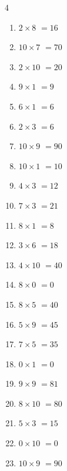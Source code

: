 \begin{multicols}{4}
\begin{enumerate}
  \item $2\times 8$
        $=16$

  \item $10\times 7$
        $=70$

  \item $2\times 10$
        $=20$

  \item $9\times 1$
        $=9$

  \item $6\times 1$
        $=6$

  \item $2\times 3$
        $=6$

  \item $10\times 9$
        $=90$

  \item $10\times 1$
        $=10$

  \item $4\times 3$
        $=12$

  \item $7\times 3$
        $=21$

  \item $8\times 1$
        $=8$

  \item $3\times 6$
        $=18$

  \item $4\times 10$
        $=40$

  \item $8\times 0$
        $=0$

  \item $8\times 5$
        $=40$

  \item $5\times 9$
        $=45$

  \item $7\times 5$
        $=35$

  \item $0\times 1$
        $=0$

  \item $9\times 9$
        $=81$

  \item $8\times 10$
        $=80$

  \item $5\times 3$
        $=15$

  \item $0\times 10$
        $=0$

  \item $10\times 9$
        $=90$


\end{enumerate}
\end{multicols}
